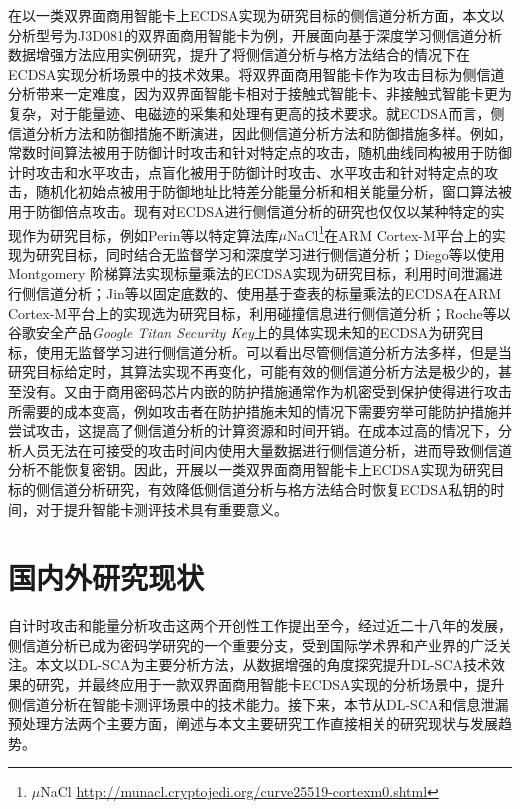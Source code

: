 {	%
	在以一类双界面商用智能卡上ECDSA实现为研究目标的侧信道分析方面，本文以分析型号为J3D081的双界面商用智能卡为例，开展面向基于深度学习侧信道分析数据增强方法应用实例研究，提升了将侧信道分析与格方法结合的情况下在ECDSA实现分析场景中的技术效果。将双界面商用智能卡作为攻击目标为侧信道分析带来一定难度，因为双界面智能卡相对于接触式智能卡、非接触式智能卡更为复杂，对于能量迹、电磁迹的采集和处理有更高的技术要求。就ECDSA而言，侧信道分析方法和防御措施不断演进，因此侧信道分析方法和防御措施多样。例如，常数时间算法被用于防御计时攻击\citep{Kocher96}和针对特定点的攻击\citep{Sato04}，随机曲线同构\citep{Joye01}被用于防御计时攻击\citep{Kocher96}和水平攻击\citep{Clavier10}，点盲化\citep{Coron99}被用于防御计时攻击\citep{Kocher96}、水平攻击\citep{Clavier10}和针对特定点的攻击\citep{Sato04}，随机化初始点\citep{Mamiya04,Abidalrahman10,Tawalbeh16}被用于防御地址比特差分能量分析\citep{Itoh02}和相关能量分析\citep{Coron99}，窗口算法\citep{Reddy11}被用于防御倍点攻击\citep{Fouque03}。现有对ECDSA进行侧信道分析的研究也仅仅以某种特定的实现作为研究目标，例如Perin等\citep{Perin20}以特定算法库$\mu$NaCl\footnote{$\mu$NaCl \href{http://munacl.cryptojedi.org/curve25519-cortexm0.shtml}{http://munacl.cryptojedi.org/curve25519-cortexm0.shtml}}在ARM Cortex-M平台上的实现为研究目标，同时结合无监督学习和深度学习进行侧信道分析；Diego等\citep{Diego20}以使用Montgomery 阶梯算法\citep{Cohen05,Blake05}实现标量乘法的ECDSA实现为研究目标，利用时间泄漏进行侧信道分析；Jin等\citep{Jin21}以固定底数的、使用基于查表的标量乘法的ECDSA在ARM Cortex-M平台上的实现选为研究目标，利用碰撞信息进行侧信道分析；Roche等\citep{Roche21}以谷歌安全产品\textit{Google Titan Security Key}\citep{Titan}上的具体实现未知的ECDSA为研究目标，使用无监督学习进行侧信道分析。可以看出尽管侧信道分析方法多样，但是当研究目标给定时，其算法实现不再变化，可能有效的侧信道分析方法是极少的，甚至没有。又由于商用密码芯片内嵌的防护措施通常作为机密受到保护使得进行攻击所需要的成本变高，例如攻击者在防护措施未知的情况下需要穷举可能防护措施并尝试攻击，这提高了侧信道分析的计算资源和时间开销。在成本过高的情况下，分析人员无法在可接受的攻击时间内使用大量数据进行侧信道分析，进而导致侧信道分析不能恢复密钥。因此，开展以一类双界面商用智能卡上ECDSA实现为研究目标的侧信道分析研究，有效降低侧信道分析与格方法结合时恢复ECDSA私钥的时间，对于提升智能卡测评技术具有重要意义。
	
	\section{国内外研究现状}
	
	自计时攻击\citep{Kocher96}和能量分析攻击\citep{KocherJJ99}这两个开创性工作提出至今，经过近二十八年的发展，侧信道分析已成为密码学研究的一个重要分支，受到国际学术界和产业界的广泛关注。本文以DL-SCA为主要分析方法，从数据增强的角度探究提升DL-SCA技术效果的研究，并最终应用于一款双界面商用智能卡ECDSA实现的分析场景中，提升侧信道分析在智能卡测评场景中的技术能力。接下来，本节从DL-SCA和信息泄漏预处理方法两个主要方面，阐述与本文主要研究工作直接相关的研究现状与发展趋势。
}

